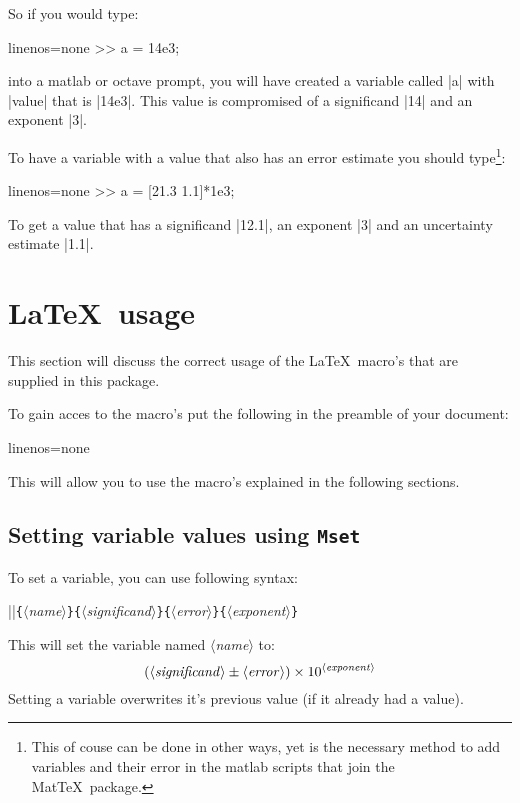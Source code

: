 \documentclass[a4paper,10pt]{article}
\makeatletter
\newcommand{\mt}{Mat\TeX\ }
\newcommand\argu[1]{{\color{black}$\langle$\textit{#1}$\rangle$}}
\newcommand\ARGU[1]{\texttt{\{}\argu{#1}\texttt{\}}}
\newcommand\co[0]{\color{violet}}
\newcommand\mtmrg[1]{\marginpar{\texttt{#1}}}
\newcommand\mrg[1]{\index{#1@\texttt{\textbackslash #1}}\mtmrg{\textbackslash #1}}
\makeatother
\begin{document}
So if you would type:
\begin{center}
	\begin{matlabcode*}{linenos=none}
		>> a = 14e3;
	\end{matlabcode*}
\end{center}
into a matlab or octave prompt, you will have created a variable called |a| with |value| that is |14e3|. This value is compromised of a significand |14| and an exponent |3|. 

To have a variable with a value that also has an error estimate you should type\footnote{This of couse can be done in other ways, yet is the necessary method to add variables and their error in the matlab scripts that join the \mt package.}:
\begin{center}
	\begin{matlabcode*}{linenos=none}
		>> a = [21.3 1.1]*1e3;
	\end{matlabcode*}
\end{center}
To get a value that has a significand |12.1|, an exponent |3| and an uncertainty estimate |1.1|.



\section{\LaTeX\ usage}
This section will discuss the correct usage of the \LaTeX\ macro's that are supplied in this package.

To gain acces to the macro's put the following in the preamble of your document:
\begin{center}
	\begin{texcode*}{linenos=none}
		\usepackage{mattex}
	\end{texcode*}
\end{center}
This will allow you to use the macro's explained in the following sections.

\subsection{Setting variable values using \texttt{Mset}}
To set a variable,  you can use following syntax:

{\co|\Mset|\ARGU{name}\ARGU{significand}\ARGU{error}\ARGU{exponent}}

\mrg{Mset}
This will set the variable named \argu{name} to:
\[ 
	(\text{\argu{significand}} \pm \text{\argu{error}}) \times 10^{\text{\argu{exponent}}}
\]
Setting a variable overwrites it's previous value (if it already had a value).
\end{document}
